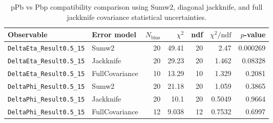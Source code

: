 \begin{table}[htbp]
\centering
\begin{tabular}{|l|l|r|r|r|r|r|}
\hline
Observable & Error model & $N_{\mathrm{bins}}$ & $\chi^2$ & ndf & $\chi^2/\mathrm{ndf}$ & $p$-value \\
\hline
\texttt{DeltaEta_Result0.5_15} & Sumw2 & 20 & 49.41 & 20 & 2.47 & 0.000269 \\
\texttt{DeltaEta_Result0.5_15} & Jackknife & 20 & 29.23 & 20 & 1.462 & 0.08328 \\
\texttt{DeltaEta_Result0.5_15} & FullCovariance & 10 & 13.29 & 10 & 1.329 & 0.2081 \\
\texttt{DeltaPhi_Result0.5_15} & Sumw2 & 20 & 21.18 & 20 & 1.059 & 0.3865 \\
\texttt{DeltaPhi_Result0.5_15} & Jackknife & 20 & 10.1 & 20 & 0.5049 & 0.9664 \\
\texttt{DeltaPhi_Result0.5_15} & FullCovariance & 12 & 9.038 & 12 & 0.7532 & 0.6997 \\
\hline
\end{tabular}
\caption{pPb vs Pbp compatibility comparison using Sumw2, diagonal jackknife, and full jackknife covariance statistical uncertainties.}
\label{tab:ppbp-compatibility}
\end{table}
